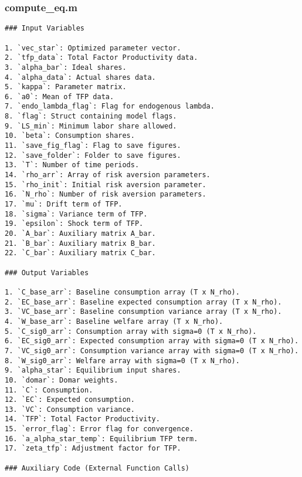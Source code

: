 \documentclass[11pt]{article}
\theoremstyle{definition}
\begin{document}
	
	
	\subsubsection{compute\_eq.m}
	\begin{lstlisting}[style=Matlab]
### Input Variables

1. `vec_star`: Optimized parameter vector.
2. `tfp_data`: Total Factor Productivity data.
3. `alpha_bar`: Ideal shares.
4. `alpha_data`: Actual shares data.
5. `kappa`: Parameter matrix.
6. `a0`: Mean of TFP data.
7. `endo_lambda_flag`: Flag for endogenous lambda.
8. `flag`: Struct containing model flags.
9. `LS_min`: Minimum labor share allowed.
10. `beta`: Consumption shares.
11. `save_fig_flag`: Flag to save figures.
12. `save_folder`: Folder to save figures.
13. `T`: Number of time periods.
14. `rho_arr`: Array of risk aversion parameters.
15. `rho_init`: Initial risk aversion parameter.
16. `N_rho`: Number of risk aversion parameters.
17. `mu`: Drift term of TFP.
18. `sigma`: Variance term of TFP.
19. `epsilon`: Shock term of TFP.
20. `A_bar`: Auxiliary matrix A_bar.
21. `B_bar`: Auxiliary matrix B_bar.
22. `C_bar`: Auxiliary matrix C_bar.

### Output Variables

1. `C_base_arr`: Baseline consumption array (T x N_rho).
2. `EC_base_arr`: Baseline expected consumption array (T x N_rho).
3. `VC_base_arr`: Baseline consumption variance array (T x N_rho).
4. `W_base_arr`: Baseline welfare array (T x N_rho).
5. `C_sig0_arr`: Consumption array with sigma=0 (T x N_rho).
6. `EC_sig0_arr`: Expected consumption array with sigma=0 (T x N_rho).
7. `VC_sig0_arr`: Consumption variance array with sigma=0 (T x N_rho).
8. `W_sig0_arr`: Welfare array with sigma=0 (T x N_rho).
9. `alpha_star`: Equilibrium input shares.
10. `domar`: Domar weights.
11. `C`: Consumption.
12. `EC`: Expected consumption.
13. `VC`: Consumption variance.
14. `TFP`: Total Factor Productivity.
15. `error_flag`: Error flag for convergence.
16. `a_alpha_star_temp`: Equilibrium TFP term.
17. `zeta_tfp`: Adjustment factor for TFP.

### Auxiliary Code (External Function Calls)


\end{lstlisting}
\end{document}
